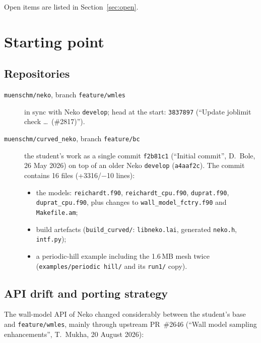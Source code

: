\documentclass[11pt,a4paper]{article}
\newcommand{\code}[1]{\texttt{#1}}
\begin{document}
\noindent Open items are listed in Section~\ref{sec:open}.

\section{Starting point}

\subsection{Repositories}

\begin{description}
  \item[\code{muenschm/neko}, branch \code{feature/wmles}] in sync with Neko
    \code{develop}; head at the start: \code{3837897} (``Update joblimit
    check \ldots\ (\#2817)'').
  \item[\code{muenschm/curved\_neko}, branch \code{feature/bc}] the
    student's work as a single commit \code{f2b81c1} (``Initial commit'',
    D.~Bole, 26 May 2026) on top of an older Neko \code{develop}
    (\code{a4aaf2c}). The commit contains 16 files (+3316/$-$10 lines):
    \begin{itemize}
      \item the models: \code{reichardt.f90}, \code{reichardt\_cpu.f90},
        \code{duprat.f90}, \code{duprat\_cpu.f90}, plus changes to
        \code{wall\_model\_fctry.f90} and \code{Makefile.am};
      \item build artefacts (\code{build\_curved/}: \code{libneko.lai},
        generated \code{neko.h}, \code{intf.py});
      \item a periodic-hill example including the 1.6\,MB mesh twice
        (\code{examples/periodic hill/} and its \code{run1/} copy).
    \end{itemize}
\end{description}

\subsection{API drift and porting strategy}

The wall-model API of Neko changed considerably between the student's base
and \code{feature/wmles}, mainly through upstream PR~\#2646 (``Wall model
sampling enhancements'', T.~Mukha, 20 August 2026):
\end{document}
